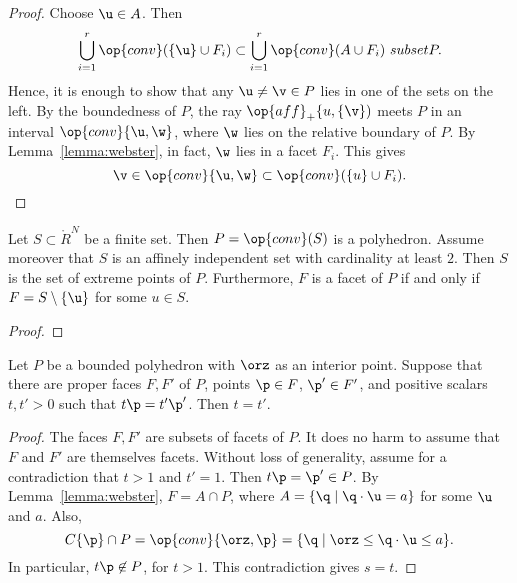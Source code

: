 \begin{proof}
Choose $\u\in A$.   Then
\begin{displaymath}
\bigcup_{i=1}^r \op{conv}(\{\u\}\cup F_i) \subset \bigcup_{i=1}^r \op{conv}(A\cup F_i)\ subset P.
\end{displaymath}
Hence, it is enough to show that any $\u\ne\v\in P$ lies in one of the sets on the left.
By the boundedness of $P$, the ray $\op{aff}_+\{u,\{\v\})$ meets $P$ in an interval
$\op{conv}\{\u,\w\}$, where $\w$ lies on the relative boundary of $P$.  By Lemma~\ref{lemma:webster}, in fact, $\w$ lies in a facet $F_i$.  This gives
\begin{displaymath}
 \v\in \op{conv}\{\u,\w\}\subset \op{conv}(\{u\}\cup F_i).
\end{displaymath}
\end{proof}


\begin{lemma}[]\label{lemma:simplex-poly}
  Let $S\subset\ring{R}^N$ be a finite set.  Then $P=\op{conv}(S)$ is
  a polyhedron.  Assume moreover that $S$ is an affinely independent
  set with cardinality at least $2$.  Then $S$ is the set of extreme
  points of $P$. Furthermore,   $F$ is a facet of $P$ if and only if $F =
  S\setminus \{\u\}$ for some $u\in S$.
\end{lemma}

\begin{proof}
\end{proof}

\begin{lemma}[] \label{lemma:scale} 
Let $P$ be a bounded polyhedron with $\orz$ as an interior point.
Suppose that there are proper faces $F,F'$ of $P$, points $\p\in F$,
$\p'\in F'$, and positive scalars $t,t' >0$ such that $t \p = t' \p'$.
Then $t=t'$.
\end{lemma}

\begin{proof} The faces $F,F'$ are subsets of facets of $P$.  It does
no harm to assume that $F$ and $F'$ are themselves facets.  Without
loss of generality, assume for a contradiction that $t>1$ and $t'=1$.
Then $t\p = \p'\in P$.
By Lemma~\ref{lemma:webster}, $F = A \cap P$, where $A= \{\q
\mid \q\cdot \u = a\}$ for some $\u$ and $a$.  Also,
\begin{displaymath}
C\{\p\}\cap P = \op{conv}\{\orz,\p\} = \{\q \mid \orz\le \q\cdot \u \le a\}.
\end{displaymath}
In particular, $t \p\not\in P$, for $t>1$.  This contradiction gives
$s = t$.
\end{proof}





